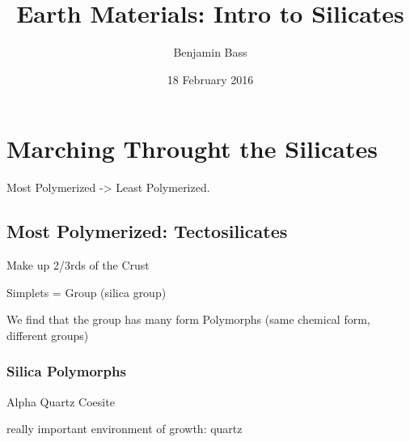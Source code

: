 \documentclass[11pt]{article}
\author{Benjamin Bass}
\date{18 February 2016}
\title{Earth Materials: Intro to Silicates}
\begin{document}
\maketitle
\tableofcontents

\pagebreak

\section{Marching Throught the Silicates}
\label{sec-1}

Most Polymerized -> Least Polymerized.

\subsection{Most Polymerized: Tectosilicates}
\label{sec-1-1}

Make up 2/3rds of the Crust

Simplets =   Group (silica group)

We find that the  group has many form
Polymorphs (same chemical form, different groups)

\subsubsection{Silica Polymorphs}
\label{sec-1-1-1}

Alpha Quartz
Coesite

really important environment of growth: quartz
\end{document}
